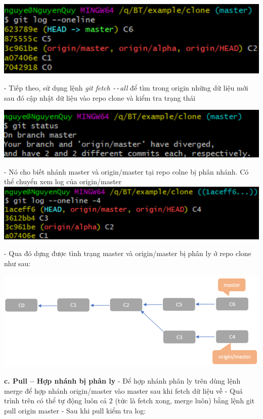 \documentclass[12pt,a4paper]{report}
\begin{document}
 	\label{fig:screenshot071}
 \vskip 0.4cm\vskip 0.4cm
 	\includegraphics[width=0.8\linewidth]{screenshot072}
 
 	\label{fig:screenshot072}
\vskip 0.4cm\vskip 0.4cm
 - Tiếp theo, sử dụng lệnh {\it git fetch \texttt{-{}-}all} để  tìm trong origin những dữ liệu mới sau đó cập nhật dữ liệu vào repo clone và kiểm tra trạng thái\vskip 0.4cm

 	\includegraphics[width=0.8\linewidth]{screenshot073}
 
 	\label{fig:screenshot073}\vskip 0.4cm\vskip 0.4cm

 - Nó cho biết nhánh master và origin/master tại repo colne bị phân nhánh. Có thể chuyển xem log của origin/master
\vskip 0.4cm
 	\includegraphics[width=0.8\linewidth]{screenshot074}
 
 	\label{fig:screenshot074}
 \vskip 0.4cm\vskip 0.4cm
 - Qua đó dựng được tình trạng master và origin/master bị phân ly ở repo clone như sau:\vskip 0.4cm

 	\includegraphics[width=0.8\linewidth]{screenshot075}
 
 	\label{fig:screenshot075}
 \vskip 0.4cm\vskip 0.4cm
{\bf c. Pull – Hợp nhánh bị phân ly}\vskip 0.4cm
 - Để hợp nhánh phân ly trên dùng lệnh merge để hợp nhánh origin/master vào master sau khi fetch dữ liệu về\vskip 0.4cm
 - Quá trình trên có thể tự động luôn cả 2 (tức là fetch xong, merge luôn) bằng lệnh git pull origin master\vskip 0.4cm
 -  Sau khi pull kiểm tra log:\vskip 0.4cm
 
\end{document}
